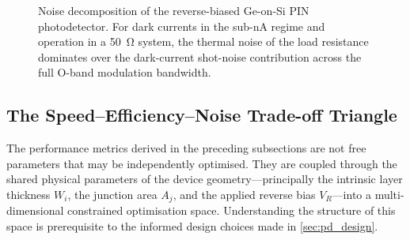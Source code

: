 \begin{figure}[H]
    \centering
    \caption{Noise decomposition of the reverse-biased Ge-on-Si PIN
    photodetector. For dark currents in the sub-\si{\nano\ampere} regime and
    operation in a \SI{50}{\ohm} system, the thermal noise of the load
    resistance dominates over the dark-current shot-noise contribution across
    the full O-band modulation bandwidth.}
    \label{fig:noise_decomposition}
\end{figure}

\subsection[The Speed--Efficiency--Noise Trade-off]{The Speed--Efficiency--Noise Trade-off Triangle}
\label{subsec:pd_tradeoffs}

The performance metrics derived in the preceding subsections are not free
parameters that may be independently optimised. They are coupled through the
shared physical parameters of the device geometry---principally the intrinsic
layer thickness $W_i$, the junction area $A_j$, and the applied reverse bias
$V_R$---into a multi-dimensional constrained optimisation space. Understanding
the structure of this space is prerequisite to the informed design choices
made in \cref{sec:pd_design}.

